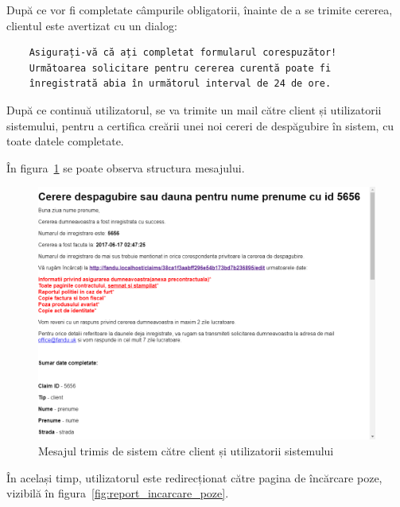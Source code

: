 	După ce vor fi completate câmpurile obligatorii, înainte de a se trimite cererea, clientul este avertizat cu un dialog:
	\begin{verbatim}
	Asigurați-vă că ați completat formularul corespuzător!
	Următoarea solicitare pentru cererea curentă poate fi
	înregistrată abia în următorul interval de 24 de ore.
	\end{verbatim}

	După ce continuă utilizatorul, se va trimite un mail către client și utilizatorii sistemului, pentru a certifica creării unei noi cereri de despăgubire în sistem, cu toate datele completate.

	În figura~\ref{fig:message_new_claim} se poate observa structura mesajului.

	\begin{figure}
		\includegraphics[width=\linewidth]{../imagini/message_new_claim.png}
		\caption{Mesajul trimis de sistem către client și utilizatorii sistemului}
		\label{fig:message_new_claim}
	\end{figure}

	În același timp, utilizatorul este redirecționat către pagina de încărcare poze, vizibilă în figura~\ref{fig:report_incarcare_poze}.

